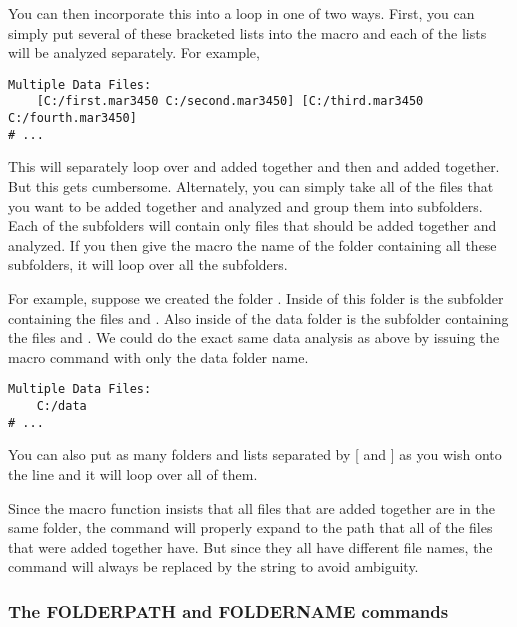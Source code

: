 You can then incorporate this into a loop in
one of two ways. First, you can simply put several
of these bracketed lists into the macro and each
of the lists will be analyzed separately. For example,
\begin{lstlisting}[caption={'Loop Over the Analysis'}]
Multiple Data Files:
    [C:/first.mar3450 C:/second.mar3450] [C:/third.mar3450 C:/fourth.mar3450]
# ...
\end{lstlisting}
This will separately loop over  
and  added together and then 
 and 
added together. But this gets cumbersome. Alternately,
you can simply take all of the files that you want to be 
added together and analyzed and group them into subfolders. 
Each of the subfolders will contain only files that should
be added together and analyzed. If you then give the
macro the name of the folder containing all these subfolders,
it will loop over all the subfolders. 

For example, suppose we created the folder .
Inside of this folder is the subfolder 
containing the files  and 
. Also inside of the data folder
is the subfolder  containing the files
 and .
We could do the exact same data analysis as above by 
issuing the macro command with only the data folder name.
\begin{lstlisting}[caption={'Using the Folder Syntax'}]
Multiple Data Files:
    C:/data
# ...
\end{lstlisting}
You can also put as many folders and lists separated
by [ and ] as you wish onto the line and it will loop
over all of them.

Since the macro function insists that all files 
that are added together are in the same folder,
the  command will properly expand 
to the path that all of the files that were added 
together have. But since they all have different file 
names, the  command will always be 
replaced by the string 
to avoid ambiguity.

\subsubsection{The FOLDERPATH and FOLDERNAME commands}

